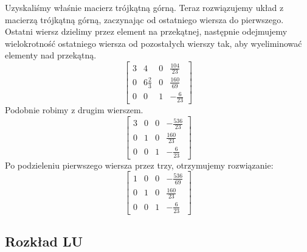 \documentclass[../main.tex]{subfiles}
\begin{document}
\begin{example}
      Uzyskaliśmy właśnie macierz trójkątną górną. Teraz rozwiązujemy
      układ z macierzą trójkątną górną, zaczynając od ostatniego wiersza do
      pierwszego. Ostatni wiersz dzielimy przez element na przekątnej,
      następnie odejmujemy wielokrotność ostatniego wiersza od pozostałych
      wierszy tak, aby wyeliminować elementy nad przekątną.
      \begin{equation*}
        \left[ \begin{array}{ccc|c}
          3 & 4             & 0             & \frac{104}{23}   \\
          0 & 6\frac{2}{3}  & 0             & \frac{160}{69}   \\
          0 & 0             & 1             & -\frac{6}{23}
        \end{array}\right]
      \end{equation*}
      Podobnie robimy z drugim wierszem. 
      \begin{equation*}
        \left[ \begin{array}{ccc|c}
          3 & 0             & 0             & -\frac{536}{23}  \\
          0 & 1             & 0             & \frac{160}{23}   \\
          0 & 0             & 1             & -\frac{6}{23}
        \end{array}\right]
      \end{equation*}
      Po podzieleniu pierwszego wiersza przez trzy, otrzymujemy rozwiązanie:
      \begin{equation*}
        \left[ \begin{array}{ccc|c}
          1 & 0             & 0             & -\frac{536}{69}  \\
          0 & 1             & 0             & \frac{160}{23}   \\
          0 & 0             & 1             & -\frac{6}{23}
        \end{array}\right]
      \end{equation*}
    \end{example}

    \subsection{Rozkład LU}
\end{document}
